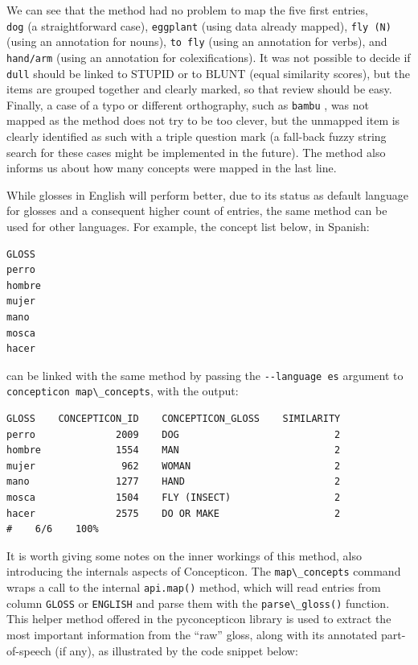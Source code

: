 \documentclass[
  a4paper,
  14pt,
  oneside,
  tablecaptionabove
]{scrbook}
\newcommand{\passthrough}[1]{#1}
\begin{document}
We can see that the method had no problem to map the five first
entries,\\
\passthrough{\lstinline!dog!} (a straightforward case),
\passthrough{\lstinline!eggplant!} (using data already mapped),
\passthrough{\lstinline!fly (N)!} (using an annotation for nouns),
\passthrough{\lstinline!to fly!} (using an annotation for verbs), and
\passthrough{\lstinline!hand/arm!} (using an annotation for
colexifications). It was not possible to decide if
\passthrough{\lstinline!dull!} should be linked to STUPID or to BLUNT
(equal similarity scores), but the items are grouped together and
clearly marked, so that review should be easy. Finally, a case of a typo
or different orthography, such as \passthrough{\lstinline!bambu!} , was
not mapped as the method does not try to be too clever, but the unmapped
item is clearly identified as such with a triple question mark (a
fall-back fuzzy string search for these cases might be implemented in
the future). The method also informs us about how many concepts were
mapped in the last line.

While glosses in English will perform better, due to its status as
default language for glosses and a consequent higher count of entries,
the same method can be used for other languages. For example, the
concept list below, in Spanish:

\begin{lstlisting}
GLOSS
perro
hombre
mujer
mano
mosca
hacer
\end{lstlisting}

can be linked with the same method by passing the
\passthrough{\lstinline!--language es!} argument to
\passthrough{\lstinline!concepticon map\_concepts!}, with the output:

\begin{lstlisting}
GLOSS    CONCEPTICON_ID    CONCEPTICON_GLOSS    SIMILARITY
perro              2009    DOG                           2
hombre             1554    MAN                           2
mujer               962    WOMAN                         2
mano               1277    HAND                          2
mosca              1504    FLY (INSECT)                  2
hacer              2575    DO OR MAKE                    2
#    6/6    100%
\end{lstlisting}

It is worth giving some notes on the inner workings of this method, also
introducing the internals aspects of Concepticon. The
\passthrough{\lstinline!map\_concepts!} command wraps a call to the
internal \passthrough{\lstinline!api.map()!} method, which will read
entries from column \passthrough{\lstinline!GLOSS!} or
\passthrough{\lstinline!ENGLISH!} and parse them with the
\passthrough{\lstinline!parse\_gloss()!} function. This helper method
offered in the pyconcepticon library is used to extract the most
important information from the \enquote{raw} gloss, along with its
annotated part-of-speech (if any), as illustrated by the code snippet
below:
\end{document}
